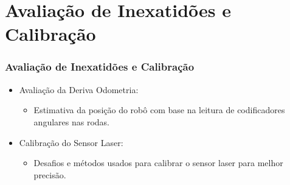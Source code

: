 \documentclass[xcolor=dvipsnames, aspectratio=169]{beamer}
\begin{document}
\section{Avaliação de Inexatidões e Calibração}
  \begin{frame}
  \frametitle{Avaliação de Inexatidões e Calibração}
  \begin{itemize}
      \item Avaliação da Deriva Odometria: 
      \begin{itemize}
        \item Estimativa da posição do robô com base na leitura de codificadores angulares nas rodas.
      \end{itemize}
      \item Calibração do Sensor Laser:
      \begin{itemize}
        \item Desafios e métodos usados para calibrar o sensor laser para melhor precisão.
      \end{itemize}
  \end{itemize}
\end{frame}
  

\end{document}

